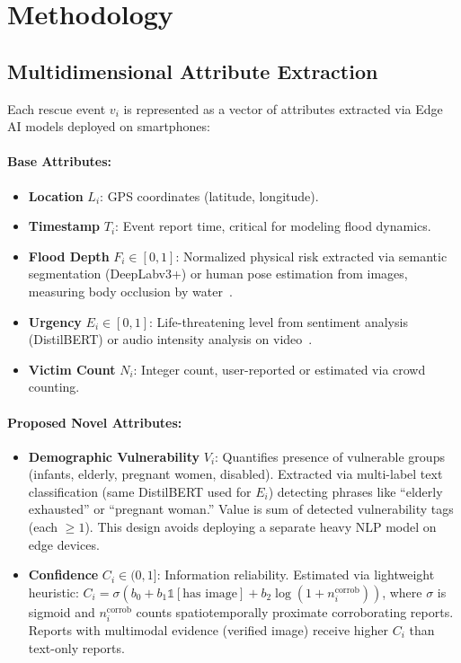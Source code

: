 \documentclass[runningheads]{llncs}
\begin{document}
\section{Methodology}

\subsection{Multidimensional Attribute Extraction}

Each rescue event $v_i$ is represented as a vector of attributes extracted via Edge AI models deployed on smartphones:

\paragraph{Base Attributes:}
\begin{itemize}
\item \textbf{Location} $L_i$: GPS coordinates (latitude, longitude).
\item \textbf{Timestamp} $T_i$: Event report time, critical for modeling flood dynamics.
\item \textbf{Flood Depth} $F_i \in [0,1]$: Normalized physical risk extracted via semantic segmentation (DeepLabv3+) or human pose estimation from images, measuring body occlusion by water~\cite{rahnemoonfar2021floodnet}.
\item \textbf{Urgency} $E_i \in [0,1]$: Life-threatening level from sentiment analysis (DistilBERT) or audio intensity analysis on video~\cite{sanh2019distilbert}.
\item \textbf{Victim Count} $N_i$: Integer count, user-reported or estimated via crowd counting.
\end{itemize}

\paragraph{Proposed Novel Attributes:}
\begin{itemize}
\item \textbf{Demographic Vulnerability} $V_i$: Quantifies presence of vulnerable groups (infants, elderly, pregnant women, disabled). Extracted via multi-label text classification (same DistilBERT used for $E_i$) detecting phrases like ``elderly exhausted'' or ``pregnant woman.'' Value is sum of detected vulnerability tags (each $\ge 1$). This design avoids deploying a separate heavy NLP model on edge devices.
\item \textbf{Confidence} $C_i \in (0,1]$: Information reliability. Estimated via lightweight heuristic: $C_i = \sigma(b_0 + b_1 \mathbb{1}[\text{has image}] + b_2 \log(1 + n_i^{\text{corrob}}))$, where $\sigma$ is sigmoid and $n_i^{\text{corrob}}$ counts spatiotemporally proximate corroborating reports. Reports with multimodal evidence (verified image) receive higher $C_i$ than text-only reports.
\end{itemize}
\end{document}
